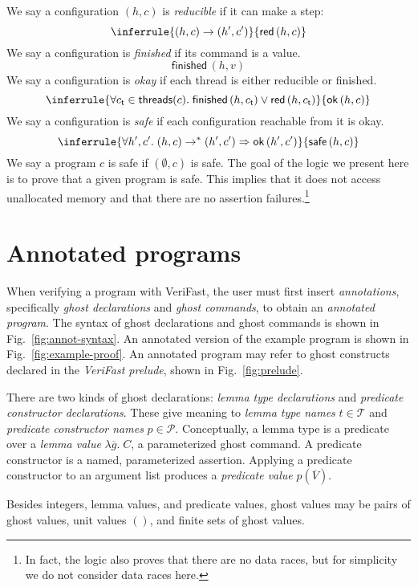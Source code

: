 \documentclass{article}
\begin{document}
We say a configuration $(h, c)$ is \emph{reducible} if it can make a step:
$$\inferrule{
(h, c) \rightarrow (h', c')
}{
\mathsf{red}\,(h, c)
}$$
We say a configuration is \emph{finished} if its command is a value.
$$\mathsf{finished}\,(h, v)$$
We say a configuration is \emph{okay} if each thread is either reducible or finished.
$$\inferrule{
\forall c_\mathsf{t} \in \mathsf{threads}(c).\;\mathsf{finished}\,(h, c_\mathsf{t}) \lor \mathsf{red}\,(h, c_\mathsf{t})
}{
\mathsf{ok}\,(h, c)
}$$
We say a configuration is \emph{safe} if each configuration reachable from it is okay.
$$\inferrule{
\forall h', c'.\;(h, c) \rightarrow^* (h', c') \Rightarrow \mathsf{ok}\,(h', c')
}{
\mathsf{safe}\,(h, c)
}$$
We say a program $c$ is safe if $(\emptyset, c)$ is safe. The goal of the logic we present here is to prove that a given program is safe. This implies that it does not access unallocated memory and that there are no assertion failures.\footnote{In fact, the logic also proves that there are no data races, but for simplicity we do not consider data races here.}

\section{Annotated programs}

When verifying a program with VeriFast, the user must first insert \emph{annotations}, specifically \emph{ghost declarations} and \emph{ghost commands}, to obtain an \emph{annotated program}. The syntax of ghost declarations and ghost commands is shown in Fig.~\ref{fig:annot-syntax}. An annotated version of the example program is shown in Fig.~\ref{fig:example-proof}. An annotated program may refer to ghost constructs declared in the \emph{VeriFast prelude}, shown in Fig.~\ref{fig:prelude}.

There are two kinds of ghost declarations: \emph{lemma type declarations} and \emph{predicate constructor declarations}. These give meaning to \emph{lemma type names} $t \in \mathcal{T}$ and \emph{predicate constructor names} $p \in \mathcal{P}$. Conceptually, a lemma type is a predicate over a \emph{lemma value} $\lambda \overline{g}.\;C$, a parameterized ghost command. A predicate constructor is a named, parameterized assertion. Applying a predicate constructor to an argument list produces a \emph{predicate value} $p(\overline{V})$.

Besides integers, lemma values, and predicate values, ghost values may be pairs of ghost values, unit values $()$, and finite sets of ghost values.
\end{document}
